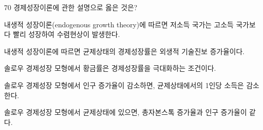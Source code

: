\begin{question}{70}
경제성장이론에 관한 설명으로 옳은 것은?
\begin{choices}
  \item 내생적 성장이론(endogenous growth theory)에 따르면 저소득 국가는 고소득 국가보다 빨리 성장하여 수렴현상이 발생한다.
  \item 내생적 성장이론에 따르면 균제상태의 경제성장률은 외생적 기술진보 증가율이다.
  \item 솔로우 경제성장 모형에서 황금률은 경제성장률을 극대화하는 조건이다.
  \item 솔로우 경제성장 모형에서 인구 증가율이 감소하면, 균제상태에서의 1인당 소득은 감소한다.
  \item 솔로우 경제성장 모형에서 균제상태에 있으면, 총자본스톡 증가율과 인구 증가율이 같다.
\end{choices}
\end{question}
